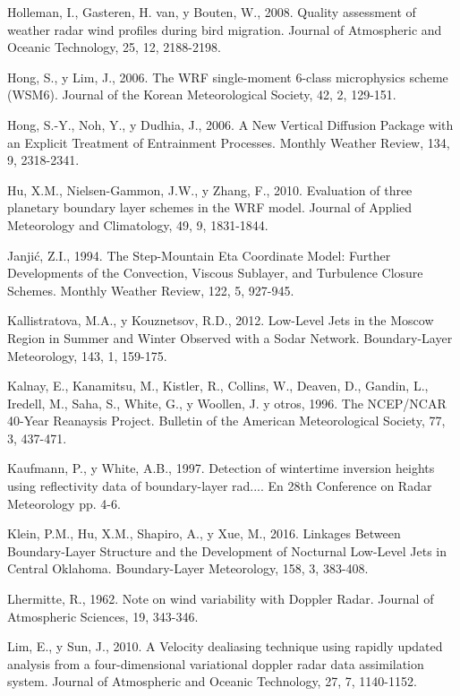 \documentclass[12pt,spanish,oneside, a4paper]{book}
\begin{document}
\hypertarget{ref-Holleman2008}{}
Holleman, I., Gasteren, H. van, y Bouten, W., 2008. Quality assessment
of weather radar wind profiles during bird migration. Journal of
Atmospheric and Oceanic Technology, 25, 12, 2188-2198.

\hypertarget{ref-Hong2006a}{}
Hong, S., y Lim, J., 2006. The WRF single-moment 6-class microphysics
scheme (WSM6). Journal of the Korean Meteorological Society, 42, 2,
129-151.

\hypertarget{ref-Hong2006}{}
Hong, S.-Y., Noh, Y., y Dudhia, J., 2006. A New Vertical Diffusion
Package with an Explicit Treatment of Entrainment Processes. Monthly
Weather Review, 134, 9, 2318-2341.

\hypertarget{ref-Hu2010}{}
Hu, X.M., Nielsen-Gammon, J.W., y Zhang, F., 2010. Evaluation of three
planetary boundary layer schemes in the WRF model. Journal of Applied
Meteorology and Climatology, 49, 9, 1831-1844.

\hypertarget{ref-Janjic1994}{}
Janjić, Z.I., 1994. The Step-Mountain Eta Coordinate Model: Further
Developments of the Convection, Viscous Sublayer, and Turbulence Closure
Schemes. Monthly Weather Review, 122, 5, 927-945.

\hypertarget{ref-Kallistratova2012}{}
Kallistratova, M.A., y Kouznetsov, R.D., 2012. Low-Level Jets in the
Moscow Region in Summer and Winter Observed with a Sodar Network.
Boundary-Layer Meteorology, 143, 1, 159-175.

\hypertarget{ref-Kalnay1996}{}
Kalnay, E., Kanamitsu, M., Kistler, R., Collins, W., Deaven, D., Gandin,
L., Iredell, M., Saha, S., White, G., y Woollen, J. y otros, 1996. The
NCEP/NCAR 40-Year Reanaysis Project. Bulletin of the American
Meteorological Society, 77, 3, 437-471.

\hypertarget{ref-Kaufmann1997}{}
Kaufmann, P., y White, A.B., 1997. Detection of wintertime inversion
heights using reflectivity data of boundary-layer rad.... En 28th
Conference on Radar Meteorology pp. 4-6.

\hypertarget{ref-Klein2016}{}
Klein, P.M., Hu, X.M., Shapiro, A., y Xue, M., 2016. Linkages Between
Boundary-Layer Structure and the Development of Nocturnal Low-Level Jets
in Central Oklahoma. Boundary-Layer Meteorology, 158, 3, 383-408.

\hypertarget{ref-Lhermitte1962}{}
Lhermitte, R., 1962. Note on wind variability with Doppler Radar.
Journal of Atmospheric Sciences, 19, 343-346.

\hypertarget{ref-Lim2010}{}
Lim, E., y Sun, J., 2010. A Velocity dealiasing technique using rapidly
updated analysis from a four-dimensional variational doppler radar data
assimilation system. Journal of Atmospheric and Oceanic Technology, 27,
7, 1140-1152.
\end{document}
